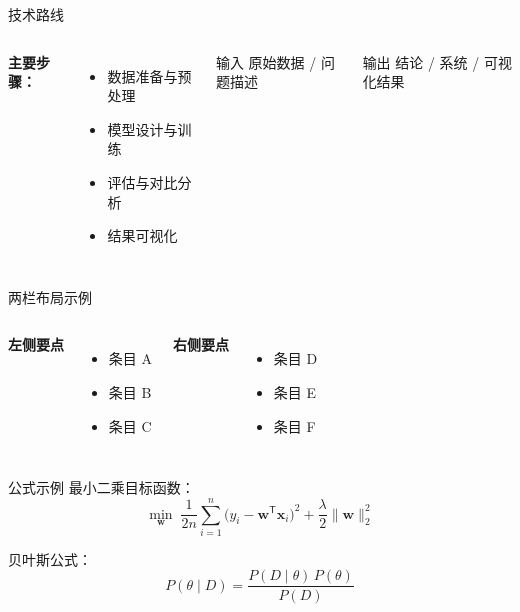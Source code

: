 \documentclass[10pt,aspectratio=169,mathserif]{beamer}
\begin{document}
\begin{frame}{技术路线}
    \begin{columns}
    \textbf{主要步骤：}
    \begin{itemize}
        \item 数据准备与预处理
        \item 模型设计与训练
        \item 评估与对比分析
        \item 结果可视化
    \end{itemize}

    \begin{block}{输入}
        原始数据 / 问题描述
    \end{block}
    \begin{exampleblock}{输出}
        结论 / 系统 / 可视化结果
    \end{exampleblock}
    \end{columns}
\end{frame}

\begin{frame}{两栏布局示例}
    \begin{columns}[T]
    \textbf{左侧要点}
    \begin{itemize}
        \item 条目 A
        \item 条目 B
        \item 条目 C
    \end{itemize}

    \textbf{右侧要点}
    \begin{itemize}
        \item 条目 D
        \item 条目 E
        \item 条目 F
    \end{itemize}
    \end{columns}
\end{frame}

\begin{frame}{公式示例}
    最小二乘目标函数：
    \[
        \min_{\mathbf{w}} \;
        \frac{1}{2n}\sum_{i=1}^{n}
        \bigl(y_i - \mathbf{w}^{\mathsf{T}}\mathbf{x}_i\bigr)^{2}
        + \frac{\lambda}{2}\|\mathbf{w}\|_{2}^{2}
    \]

    \vspace{0.4cm}
    贝叶斯公式：
    \[
        P(\theta\mid D)
        = \frac{P(D\mid\theta)\,P(\theta)}{P(D)}
    \]
\end{frame}
\end{document}
